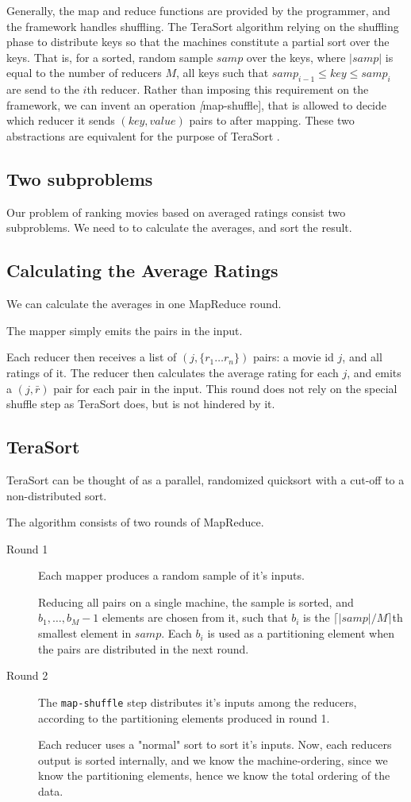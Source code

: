 Generally, the map and reduce functions are provided by the programmer, and the
framework handles shuffling. The TeraSort algorithm relying on the shuffling
phase to distribute keys so that the machines constitute a partial sort over the
keys. That is, for a sorted, random sample $samp$ over the keys, where $|samp|$ is equal to the
number of reducers $M$, all keys such that $samp_{i-1} \le key \le samp_i$ are send
to the $i$th reducer. Rather than imposing this
requirement on the framework, we can invent an operation
\textit[map-shuffle], that is allowed to decide which reducer it sends $(key,
value)$ pairs to after mapping. These two abstractions are equivalent for the
purpose of TeraSort \citep{minimalmapreduce}.

\subsection{Two subproblems}
Our problem of ranking movies based on averaged ratings
consist two subproblems. We need to to calculate the averages, and sort the
result.

\subsection{Calculating the Average Ratings}
We can calculate the averages in one MapReduce round.

The mapper simply emits the pairs in the input.

Each reducer then receives a list of $(j, \{r_1 \ldots r_n\})$ pairs: a movie id
$j$, and all ratings of it. The reducer then calculates the average rating for
each $j$, and emits a $(j, \bar{r})$ pair for each pair in the input.
This round does not rely on the special shuffle step as TeraSort does, but is
not hindered by it.

\subsection{TeraSort}
TeraSort can be thought of as a parallel, randomized quicksort with a cut-off to a
non-distributed sort.

The algorithm consists of two rounds of MapReduce.
\begin{description}
	\item[Round 1]
		Each mapper produces a random sample of it's inputs.

		Reducing all pairs on a single machine, the sample is sorted,
		and $b_1, \ldots, b_M-1$ elements are chosen from it, such that
		$b_i$ is the $\lceil |samp|/M \rceil $th smallest element in
		$samp$. Each $b_i$ is used as a partitioning element when the
		pairs are distributed in the next round.
	\item[Round 2]
		The \texttt{map-shuffle} step distributes it's inputs among the
		reducers, according to the partitioning elements produced in
		round 1.

		Each reducer uses a "normal" sort to sort it's inputs. Now, each
		reducers output is sorted internally, and we know the
		machine-ordering, since we know the partitioning elements, hence
		we know the total ordering of the data.

\end{description}

